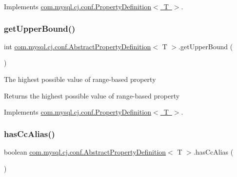 Implements \mbox{\hyperlink{interfacecom_1_1mysql_1_1cj_1_1conf_1_1_property_definition_ab2e3a44b28b1f7d76ae0f3a38029270d}{com.\+mysql.\+cj.\+conf.\+Property\+Definition$<$ T $>$}}.

\mbox{\label{classcom_1_1mysql_1_1cj_1_1conf_1_1_abstract_property_definition_ad5fda7a2939d0525ae139dcb9489a100}} 
\subsubsection{\texorpdfstring{get\+Upper\+Bound()}{getUpperBound()}}
{\footnotesize\ttfamily int \mbox{\hyperlink{classcom_1_1mysql_1_1cj_1_1conf_1_1_abstract_property_definition}{com.\+mysql.\+cj.\+conf.\+Abstract\+Property\+Definition}}$<$ T $>$.get\+Upper\+Bound (\begin{DoxyParamCaption}{ }\end{DoxyParamCaption})}

The highest possible value of range-\/based property

\begin{DoxyReturn}{Returns}
the highest possible value of range-\/based property 
\end{DoxyReturn}


Implements \mbox{\hyperlink{interfacecom_1_1mysql_1_1cj_1_1conf_1_1_property_definition_a6cebd6abc58605df93dbf06fc6c6d487}{com.\+mysql.\+cj.\+conf.\+Property\+Definition$<$ T $>$}}.

\mbox{\label{classcom_1_1mysql_1_1cj_1_1conf_1_1_abstract_property_definition_a5c08adb553273bffe89b193a112c21d3}} 
\subsubsection{\texorpdfstring{has\+Cc\+Alias()}{hasCcAlias()}}
{\footnotesize\ttfamily boolean \mbox{\hyperlink{classcom_1_1mysql_1_1cj_1_1conf_1_1_abstract_property_definition}{com.\+mysql.\+cj.\+conf.\+Abstract\+Property\+Definition}}$<$ T $>$.has\+Cc\+Alias (\begin{DoxyParamCaption}{ }\end{DoxyParamCaption})}

